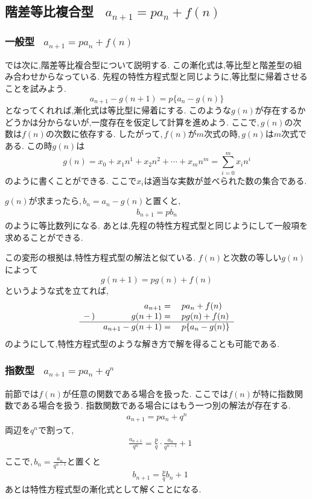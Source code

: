 
\subsection{階差等比複合型 \, $\displaystyle a_{n+1}=pa_n+f(n)$}
  \subsubsection{一般型 \, $\displaystyle a_{n+1}=pa_n+f(n)$}
    では次に,階差等比複合型について説明する.
    この漸化式は,等比型と階差型の組み合わせからなっている.
    先程の特性方程式型と同じように,等比型に帰着させることを試みよう.
    \[
      a_{n+1}-g(n+1)=p\{a_n-g(n)\}
    \]
    となってくれれば,漸化式は等比型に帰着にする.
    このような$g(n)$が存在するかどうかは分からないが,一度存在を仮定して計算を進めよう.
    ここで,\,$g(n)$の次数は$f(n)$の次数に依存する.
    したがって,\,$f(n)$が$m$次式の時,\,$g(n)$は$m$次式である.
    この時$g(n)$は
    \[
      g(n) = x_0 + x_1 n^1 + x_2 n^2  + \cdots +x_{m} n^m =\sum_{i=0}^{m} x_i n^{i}
    \]
    のように書くことができる.
    ここで$x_i$は適当な実数が並べられた数の集合である.

    $g(n)$が求まったら,\,$b_n=a_n-g(n)$と置くと,
    \begin{align*}
      b_{n+1}=pb_n
    \end{align*}
    のように等比数列になる.
    あとは,先程の特性方程式型と同じようにして一般項を求めることができる.

    この変形の根拠は,特性方程式型の解法と似ている.
    $f(n)$と次数の等しい$g(n)$によって
    \[
      g(n+1)=pg(n)+f(n)
    \]
    というような式を立てれば,
    \[
      \begin{array}{rrl}
        & a_{n+1}={} & pa_n+f(n)\\
        -\,) & g(n+1)={} & pg(n)+f(n)\\ \hline
        & a_{n+1}-g(n+1)={} & p\{a_n-g(n)\}
      \end{array}
    \]
    のようにして,特性方程式型のような解き方で解を得ることも可能である.
  \subsubsection{指数型  \, $\displaystyle a_{n+1}=pa_n+q^n$}
    前節では$f(n)$が任意の関数である場合を扱った.
    ここでは$f(n)$が特に指数関数である場合を扱う.
    指数関数である場合にはもう一つ別の解法が存在する.
    \begin{align*}
      a_{n+1}=pa_n+q^n
    \end{align*}
    両辺を$q^n$で割って,
    \begin{align*}      
      &\frac{a_{n+1}}{q^n}=\frac{p}{q}\cdot\frac{a_n}{q^{n-1}}+1\\
    \end{align*}
    ここで,\,$b_n=\frac{a_n}{q^{n-1}}$と置くと
    \begin{align*}
      &b_{n+1}=\frac{p}{q}b_n+1
    \end{align*}
    あとは特性方程式型の漸化式として解くことになる.
